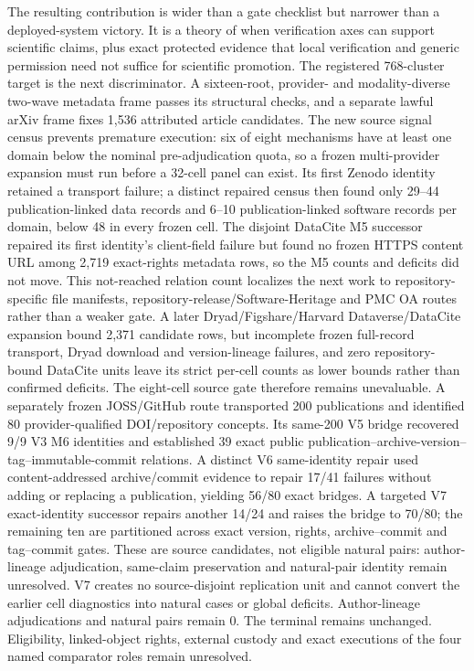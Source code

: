 The resulting contribution is wider than a gate checklist but narrower than a
deployed-system victory.  It is a theory of when verification axes can support
scientific claims, plus exact protected evidence that local verification and
generic permission need not suffice for scientific promotion.  The registered
768-cluster target is the next discriminator. A sixteen-root, provider- and
modality-diverse two-wave metadata frame passes its structural checks, and a
separate lawful arXiv frame fixes 1,536 attributed article candidates.  The
new source signal census prevents premature execution: six of eight mechanisms
have at least one domain below the nominal pre-adjudication quota, so a frozen
multi-provider expansion must run before a 32-cell panel can exist.  Its first
Zenodo identity retained a transport failure; a distinct repaired census then
found only 29--44 publication-linked data records and 6--10
publication-linked software records per domain, below 48 in every frozen cell.
The disjoint DataCite M5 successor repaired its first identity's client-field
failure but found no frozen HTTPS content URL among 2,719 exact-rights metadata
rows, so the M5 counts and deficits did not move. This not-reached relation
count localizes the next work to repository-specific file manifests,
repository-release/Software-Heritage and PMC OA routes rather than a weaker
gate. A later Dryad/Figshare/Harvard Dataverse/DataCite expansion bound 2,371
candidate rows, but incomplete frozen full-record transport, Dryad download and
version-lineage failures, and zero repository-bound DataCite units leave its
strict per-cell counts as lower bounds rather than confirmed deficits. The
eight-cell source gate therefore remains unevaluable. A separately frozen
JOSS/GitHub route transported 200 publications and identified 80
provider-qualified DOI/repository concepts. Its same-200 V5 bridge recovered
9/9 V3 M6 identities and established 39 exact public
publication--archive-version--tag--immutable-commit relations. A distinct V6
same-identity repair used content-addressed archive/commit evidence to repair
17/41 failures without adding or replacing a publication, yielding 56/80 exact
bridges. A targeted V7 exact-identity successor repairs another 14/24 and raises
the bridge to 70/80; the remaining ten are partitioned across exact version,
rights, archive--commit and tag--commit gates. These are source candidates, not
eligible natural pairs: author-lineage adjudication, same-claim preservation
and natural-pair identity remain unresolved. V7 creates no source-disjoint
replication unit and cannot convert the earlier cell diagnostics into natural
cases or global deficits. Author-lineage
adjudications and natural pairs remain 0. The terminal
 remains unchanged. Eligibility,
linked-object rights, external custody and exact executions of the four named
comparator roles remain unresolved.

